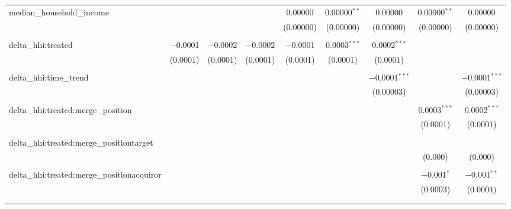 \begin{table}[H]
{\begin{tabular}{@{\extracolsep{5pt}}lcccccccc}
  median\_household\_income &  &  &  & 0.00000 & 0.00000$^{**}$ & 0.00000 & 0.00000$^{**}$ & 0.00000 \\  

   &  &  &  & (0.00000) & (0.00000) & (0.00000) & (0.00000) & (0.00000) \\  

   & & & & & & & & \\  

  delta\_hhi:treated & $-$0.0001 & $-$0.0002 & $-$0.0002 & $-$0.0001 & 0.0003$^{***}$ & 0.0002$^{***}$ &  &  \\  

   & (0.0001) & (0.0001) & (0.0001) & (0.0001) & (0.0001) & (0.0001) &  &  \\  

   & & & & & & & & \\  

  delta\_hhi:time\_trend &  &  &  &  &  & $-$0.0001$^{***}$ &  & $-$0.0001$^{***}$ \\  

   &  &  &  &  &  & (0.00003) &  & (0.00003) \\  

   & & & & & & & & \\  

  delta\_hhi:treated:merge\_position &  &  &  &  &  &  & 0.0003$^{***}$ & 0.0002$^{***}$ \\  

   &  &  &  &  &  &  & (0.0001) & (0.0001) \\  

   & & & & & & & & \\  

  delta\_hhi:treated:merge\_positiontarget &  &  &  &  &  &  &  &  \\  

   &  &  &  &  &  &  & (0.000) & (0.000) \\  

   & & & & & & & & \\  

  delta\_hhi:treated:merge\_positionacquiror &  &  &  &  &  &  & $-$0.001$^{*}$ & $-$0.001$^{**}$ \\  

   &  &  &  &  &  &  & (0.0003) & (0.0004) \\  

   & & & & & & & & \\  

 \hline \\[-1.8ex]  


\end{tabular}}
\end{table}

